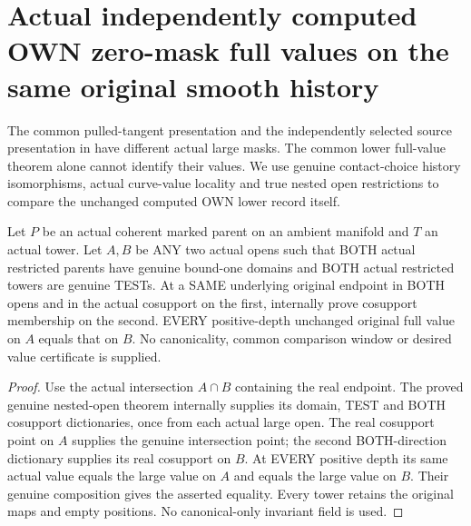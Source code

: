 \section{Actual independently computed OWN zero-mask full values on the same original smooth history}

The common pulled-tangent presentation and the independently selected
source presentation in \cite[Section~5, Step~I.B]{bierstone-milman08-functoriality}
have different actual large masks. The common lower full-value theorem
alone cannot identify their values. We use genuine contact-choice history
isomorphisms, actual curve-value locality and true nested open restrictions
to compare the unchanged computed OWN lower record itself.

\begin{lemma}
\label{hir:original-any-test-curve-full-values-two-opens}
\leanok
Let $P$ be an actual coherent marked parent on an ambient manifold and
$T$ an actual tower. Let $A,B$ be ANY two actual opens such that BOTH
actual restricted parents have genuine bound-one domains and BOTH
actual restricted towers are genuine TESTs. At a SAME underlying
original endpoint in BOTH opens and in the actual cosupport on the first,
internally prove cosupport membership on the second. EVERY
positive-depth unchanged original full value on $A$ equals that on $B$.
No canonicality, common comparison window or desired value certificate
is supplied.
\end{lemma}
\begin{proof}
Use the actual intersection $A\cap B$ containing the real endpoint.
The proved genuine nested-open theorem internally supplies its domain,
TEST and BOTH cosupport dictionaries, once from each actual large open.
The real cosupport point on $A$ supplies the genuine intersection point;
the second BOTH-direction dictionary supplies its real cosupport on $B$.
At EVERY positive depth its same actual value equals the large value
on $A$ and equals the large value on $B$. Their genuine composition
gives the asserted equality. Every tower retains the original maps and
empty positions. No canonical-only invariant field is used.
\end{proof}

